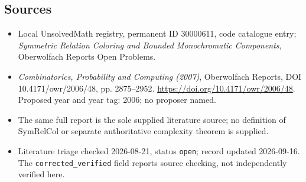 \documentclass[11pt]{article}
\begin{document}
\subsection{Sources}
\begin{itemize}\item Local UnsolvedMath registry, permanent ID 30000611, code catalogue entry; \emph{Symmetric Relation Coloring and Bounded Monochromatic Components}, Oberwolfach Reports Open Problems.\item \emph{Combinatorics, Probability and Computing (2007)}, Oberwolfach Reports, DOI 10.4171/owr/2006/48, pp. 2875--2952. \url{https://doi.org/10.4171/owr/2006/48}. Proposed year and year tag: 2006; no proposer named.\item The same full report is the sole supplied literature source; no definition of SymRelCol or separate authoritative complexity theorem is supplied.\item Literature triage checked 2026-08-21, status \texttt{open}; record updated 2026-09-16. The \texttt{corrected\_verified} field reports source checking, not independently verified here.\end{itemize}
\end{document}
